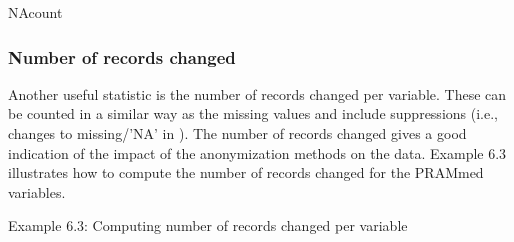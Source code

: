 \documentclass[letterpaper,10pt,english]{sphinxmanual}
\begin{document}
\begin{sphinxVerbatim}[commandchars=\\\{\}]

NAcount

 
 
 
\end{sphinxVerbatim}


\subsubsection{Number of records changed}
\label{\detokenize{utility:number-of-records-changed}}
Another useful statistic is the number of records changed per variable.
These can be counted in a similar way as the missing values and include
suppressions (i.e., changes to missing/’NA’ in ). The number of
records changed gives a good indication of the impact of the
anonymization methods on the data. Example 6.3 illustrates how to
compute the number of records changed for the PRAMmed variables.

Example 6.3: Computing number of records changed per variable
\end{document}

